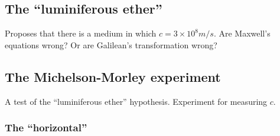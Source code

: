 \documentclass[a4paper,11pt]{article}
\numberwithin{equation}{section}
\begin{document}
 \subsection{The ``luminiferous ether''}
 Proposes that there is a medium in which $c = 3\times10^{8} \si{m/s}$.
 Are Maxwell's equations wrong? Or are Galilean's transformation wrong?
 
 \subsection{The Michelson-Morley experiment}
 A test of the ``luminiferous ether'' hypothesis. Experiment for measuring $c$.
 
 \subsubsection{The ``horizontal''}
\end{document}
